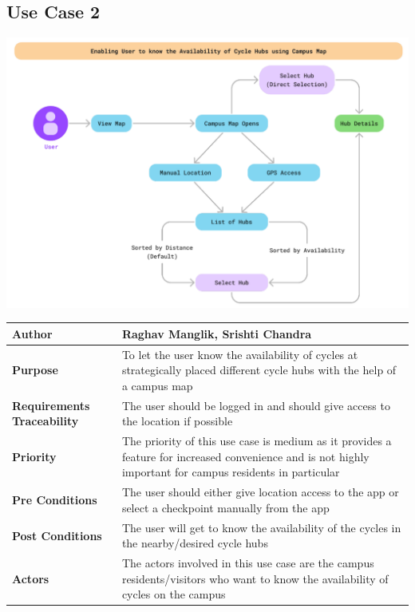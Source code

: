 \documentclass{scrreprt}
\begin{document}
\subsection{Use Case 2}
\begin{center}
\includegraphics*[scale=0.5]{usecase-2.png}
\begin{tabular}{|l|p{10cm}|}
    \hline
    \textbf{Author} & Raghav Manglik, Srishti Chandra \\
    \hline
    \textbf{Purpose} & To let the user know the availability of cycles at strategically placed different cycle hubs with the help of a campus map \\
    \hline
    \textbf{Requirements Traceability} & The user should be logged in and should give access to  the location if possible\\
    \hline
    \textbf{Priority} & The priority of this use case is medium as it provides a feature for increased convenience and is not highly important for campus residents in particular\\
    \hline
    \textbf{Pre Conditions} &The user should either give location access to the app or select a checkpoint manually from the app \\
    \hline
    \textbf{Post Conditions} & The user will get to know the availability of the cycles in the   nearby/desired cycle hubs\\
    \hline
    \textbf{Actors} & The actors involved in this use case are the campus residents/visitors who want to know the availability of cycles on the campus\\
    \hline
\end{tabular}
\end{center}
\end{document}
